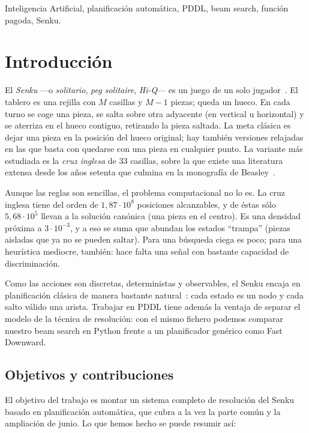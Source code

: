 \documentclass[conference,a4paper]{IEEEtran}
\begin{document}
\begin{IEEEkeywords}
  Inteligencia Artificial, planificación automática, PDDL, beam search, función
  pagoda, Senku.
\end{IEEEkeywords}


\section{Introducción}

El \emph{Senku} ---o \emph{solitario}, \emph{peg solitaire},
\emph{Hi-Q}--- es un juego de un solo jugador~\cite{enunciado}. El tablero
es una rejilla con $M$ casillas y $M\!-\!1$ piezas; queda un hueco. En cada
turno se coge una pieza, se salta sobre otra adyacente (en vertical u
horizontal) y se aterriza en el hueco contiguo, retirando la pieza saltada.
La meta clásica es dejar una pieza en la posición del hueco original; hay
también versiones relajadas en las que basta con quedarse con una pieza en
cualquier punto. La variante más estudiada es la \emph{cruz inglesa} de 33
casillas, sobre la que existe una literatura extensa desde los años setenta
que culmina en la monografía de Beasley~\cite{senku-counts}.

Aunque las reglas son sencillas, el problema computacional no lo es. La
cruz inglesa tiene del orden de $1{,}87\cdot 10^{8}$ posiciones
alcanzables, y de éstas sólo $5{,}68\cdot 10^{5}$ llevan a la solución
canónica (una pieza en el centro). Es una densidad próxima a $3\cdot
10^{-3}$, y a eso se suma que abundan los estados ``trampa'' (piezas
aisladas que ya no se pueden saltar). Para una búsqueda ciega es poco; para
una heurística mediocre, también: hace falta una señal con bastante
capacidad de discriminación.

Como las acciones son discretas, deterministas y observables, el Senku
encaja en planificación clásica de manera bastante natural~\cite{pddl-wiki}:
cada estado es un nodo y cada salto válido una arista. Trabajar en PDDL
tiene además la ventaja de separar el modelo de la técnica de resolución:
con el mismo fichero podemos comparar nuestro beam search en Python frente
a un planificador genérico como Fast Downward.

\subsection{Objetivos y contribuciones}

El objetivo del trabajo es montar un sistema completo de resolución del
Senku basado en planificación automática, que cubra a la vez la parte
común y la ampliación de junio. Lo que hemos hecho se puede resumir así:
\end{document}
